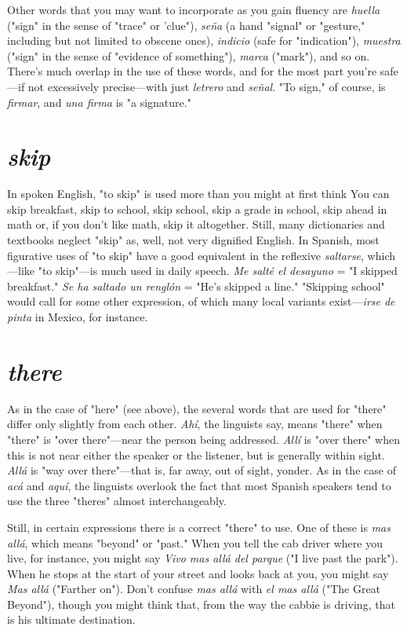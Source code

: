 Other words that you may want to incorporate as you gain fluency are \emph{huella} ("sign" in the sense of "trace" or 'clue"), \emph{seña} (a hand
"signal" or "gesture," including but not limited to obscene ones), \emph{indicio} (safe for "indication"), \emph{muestra} ("sign" in the sense of "evidence
of something"), \emph{marca} ("mark"), and so on. There's much overlap in
the use of these words, and for the most part you're safe---if not excessively precise---with just \emph{letrero} and \emph{señal}. "To sign," of course, is \emph{firmar}, and \emph{una firma} is "a signature."

\section{\emph{skip}}

In spoken English, "to skip" is used more than you might at
first think You can skip breakfast, skip to school, skip school, skip a
grade in school, skip ahead in math or, if you don't like math, skip it
altogether. Still, many dictionaries and textbooks neglect "skip" as,
well, not very dignified English. In Spanish, most figurative uses of
"to skip" have a good equivalent in the reflexive \emph{saltarse}, which---like
"to skip"---is much used in daily speech. \emph{Me salté el desayuno} = "I
skipped breakfast." \emph{Se ha saltado un renglón} = "He's skipped a line."
"Skipping school" would call for some other expression, of which
many local variants exist---\emph{irse de pinta} in Mexico, for instance.

\section{\emph{there}}

As in the case of "here" (see above), the several words that are
used for "there" differ only slightly from each other. \emph{Ahí}, the linguists
say, means "there" when "there" is "over there"---near the person
being addressed. \emph{Allí} is "over there" when this is not near either the
speaker or the listener, but is generally within sight. \emph{Allá} is "way over
there"---that is, far away, out of sight, yonder. As in the case of \emph{acá} and
\emph{aquí}, the linguists overlook the fact that most Spanish speakers tend
to use the three "theres" almost interchangeably.

Still, in certain expressions there is a correct "there" to use.
One of these is \emph{mas allá}, which means "beyond" or "past." When you
tell the cab driver where you live, for instance, you might say \emph{Vivo
mas allá del parque} ("I live past the park"). When he stops at the start
of your street and looks back at you, you might say \emph{Mas allá} ("Farther
on"). Don't confuse \emph{mas allá} with \emph{el mas allá} ("The Great Beyond"),
though you might think that, from the way the cabbie is driving, that
is his ultimate destination.

